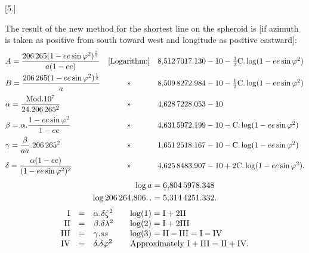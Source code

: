 \clearpage
\noindent\makebox[12mm][l]{}\par\medskip
\begin{center}[5.]\end{center}
The result of the new method for the shortest line on the spheroid
is [if azimuth is taken as positive from south toward west and longitude as positive eastward]:
\begingroup\small
\[
\begin{array}{@{}lcl@{}}
\displaystyle A=\frac{206\,265(1-ee\sin\varphi^2)^{\frac32}}{a(1-ee)}
&\text{[Logarithm:]}&8{,}512\,7017.130-10-\tfrac32\mathrm{C}.\log(1-ee\sin\varphi^2)\\[2ex]
\displaystyle B=\frac{206\,265(1-ee\sin\varphi^2)^{\frac12}}a
&\text{»}&8{,}509\,8272.984-10-\tfrac12\mathrm{C}.\log(1-ee\sin\varphi^2)\\[2ex]
\displaystyle\alpha=\frac{\mathrm{Mod}.10^7}{24.206\,265^2}
&\text{»}&4{,}628\,7228.053-10\\[2ex]
\displaystyle\beta=\alpha.\frac{1-ee\sin\varphi^2}{1-ee}
&\text{»}&4{,}631\,5972.199-10-\mathrm{C}.\log(1-ee\sin\varphi^2)\\[2ex]
\displaystyle\gamma=\frac\beta{aa}.206\,265^2
&\text{»}&1{,}651\,2518.167-10-\mathrm{C}.\log(1-ee\sin\varphi^2)\\[2ex]
\displaystyle\delta=\frac{\alpha(1-ee)}{(1-ee\sin\varphi^2)^2}
&\text{»}&4{,}625\,8483.907-10+2\mathrm{C}.\log(1-ee\sin\varphi^2).
\end{array}
\]
\endgroup
{}
\[
\begin{aligned}
\log a&=6{,}804\,5978.348\\
\log206\,264{,}806\ldotp\ldotp&=5{,}314\,4251.332.
\end{aligned}
\]
\[
\begin{array}{rcl@{\qquad}l}
\mathrm I&=&\alpha.\delta\zeta^2&\log(1)=\mathrm I+2\mathrm{II}\\
\mathrm{II}&=&\beta.\delta\lambda^2&\log(2)=\mathrm I+2\mathrm{III}\\
\mathrm{III}&=&\gamma.ss&\log(3)=\mathrm{II}-\mathrm{III}=\mathrm I-\mathrm{IV}\\
\mathrm{IV}&=&\delta.\delta\varphi^2&\text{Approximately }\mathrm I+\mathrm{III}=\mathrm{II}+\mathrm{IV}.
\end{array}
\]
